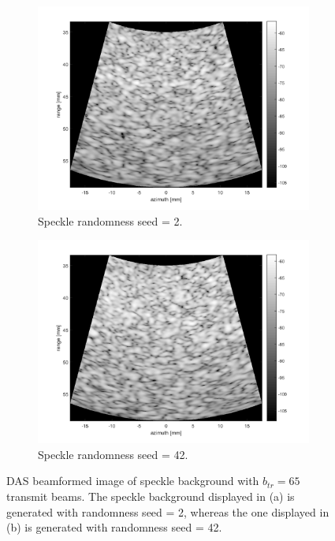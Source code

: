 \begin{figure}[ht]
    \centering
    \begin{subfigure}[t]{0.48\linewidth}
        \includegraphics[width=\linewidth]{./images/results/2.3/speckle2.png}
        \caption{Speckle randomness seed = 2.}
    \end{subfigure}
    \quad
    \begin{subfigure}[t]{0.48\linewidth}
        \includegraphics[width=\linewidth]{./images/results/2.3/speckle42.png}
        \caption{Speckle randomness seed = 42.}
    \end{subfigure}
	\caption[DAS beamformed images of speckle background with $b_{tr}=65$ transmit beams.]{DAS beamformed image of speckle background with $b_{tr}=65$ transmit beams. The speckle background displayed in (a) is generated with randomness seed = 2, whereas the one displayed in (b) is generated with randomness seed = 42.}
	\label{fig:speckle}
\end{figure}

